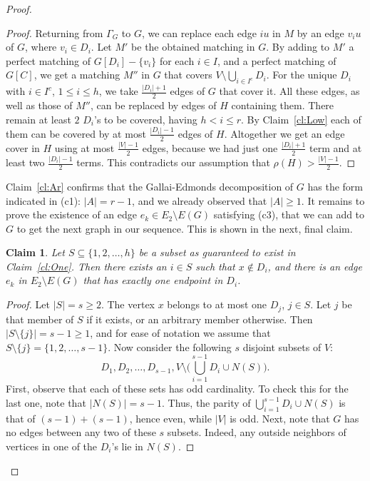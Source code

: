 \documentclass{article}
\newtheorem{claim}[theorem]{Claim}
\theoremstyle{definition}
\begin{document}
\begin{proof}
\begin{proof}
Returning from $\Gamma_G$ to $G$, we can replace each edge $iu$ in $M$ by an edge $v_iu$ of $G$, where $v_i \in D_i$. Let $M'$ be the obtained matching in $G$. By adding to $M'$ a perfect matching of $G[D_i] - \{v_i\}$ for each $i \in I$, and a perfect matching of $G[C]$, we get a matching $M''$ in $G$ that covers $V \setminus \bigcup_{i \in I^c} D_i$. For the unique $D_i$ with $i \in I^c$, $1 \le i \le h$, we take $\frac{|D_i|+1}{2}$ edges of $G$ that cover it. All these edges, as well as those of $M''$, can be replaced by edges of $H$ containing them. There remain at least $2$ $D_i$'s to be covered, having $h < i \le r$. By Claim~\ref{cl:Low} each of them can be covered by at most $\frac{|D_i|-1}{2}$ edges of $H$. Altogether we get an edge cover in $H$ using at most $\frac{|V|-1}{2}$ edges, because we had just one $\frac{|D_i|+1}{2}$ term and at least two $\frac{|D_i|-1}{2}$ terms. This contradicts our assumption that $\rho(H) > \frac{|V|-1}{2}$.
\end{proof}
Claim~\ref{cl:Ar} confirms that the Gallai-Edmonds decomposition of $G$ has the form indicated in (c1): $|A| = r - 1$, and we already observed that $|A| \ge 1$. It remains to prove the existence of an edge $e_k \in E_2 \setminus E(G)$ satisfying (c3), that we can add to $G$ to get the next graph in our sequence. This is shown in the next, final claim.
\begin{claim} \label{cl:Ek}
Let $S \subseteq \{1,2, \ldots , h\}$ be a subset as guaranteed to exist in Claim~\ref{cl:One}. Then there exists an $i \in S$ such that $x \notin D_i$, and there is an edge $e_k$ in $E_2 \setminus E(G)$ that has exactly one endpoint in $D_i$.
\end{claim}
\begin{proof}
Let $|S| = s \ge 2$. The vertex $x$ belongs to at most one $D_j$, $j \in S$. Let $j$ be that member of $S$ if it exists, or an arbitrary member otherwise. Then $|S \setminus \{j\}| = s-1 \ge 1$, and for ease of notation we assume that $S \setminus \{j\} = \{1,2, \ldots , s-1\}$. Now consider the following $s$ disjoint subsets of $V$: \[ D_1, D_2, \ldots , D_{s-1}, V \setminus \bigl( \bigcup _{i=1}^{s-1} D_i \cup N(S) \bigr).\] First, observe that each of these sets has odd cardinality. To check this for the last one, note that $|N(S)| = s-1$. Thus, the parity of $\bigcup _{i=1}^{s-1} D_i \cup N(S)$ is that of $(s-1) + (s-1)$, hence even, while $|V|$ is odd. Next, note that $G$ has no edges between any two of these $s$ subsets. Indeed, any outside neighbors of vertices in one of the $D_i$'s lie in $N(S)$.


\end{proof}
\end{proof}
\end{document}
